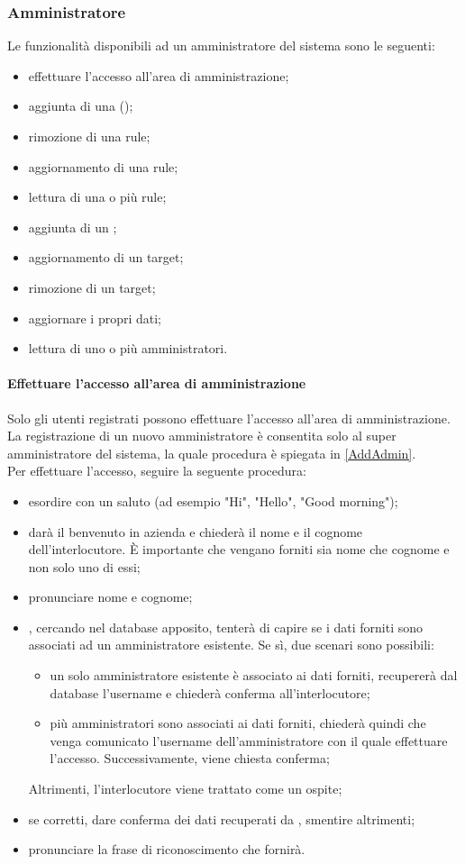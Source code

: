 \subsubsection{Amministratore}\label{admin}
Le funzionalità disponibili ad un amministratore del sistema sono le seguenti:
\begin{itemize}
	\item effettuare l'accesso all'area di amministrazione;
	\item aggiunta di una  ();
	\item rimozione di una rule;
	\item aggiornamento di una rule;
	\item lettura di una o più rule;
	\item aggiunta di un ;
	\item aggiornamento di un target;
	\item rimozione di un target;
	\item aggiornare i propri dati;
	\item lettura di uno o più amministratori.
\end{itemize}
\paragraph{Effettuare l'accesso all'area di amministrazione}\label{adminArea}
Solo gli utenti registrati possono effettuare l'accesso all'area di amministrazione. La registrazione di un nuovo amministratore è consentita solo al super amministratore del sistema, la quale procedura è spiegata in \ref{AddAdmin}. \\
Per effettuare l'accesso, seguire la seguente procedura:
\begin{itemize}
	\item esordire con un saluto (ad esempio "Hi", "Hello", "Good morning");
	\item \PROGETTO{} darà il benvenuto in azienda e chiederà il nome e il cognome dell'interlocutore. È importante che vengano forniti sia nome che cognome e non solo uno di essi;
	\item pronunciare nome e cognome;
	\item \PROGETTO, cercando nel database apposito, tenterà di capire se i dati forniti sono associati ad un amministratore esistente. Se sì, due scenari sono possibili:
	\begin{itemize}
		\item un solo amministratore esistente è associato ai dati forniti, \PROGETTO{} recupererà dal database l'username e chiederà conferma all'interlocutore;
		\item più amministratori sono associati ai dati forniti, \PROGETTO{} chiederà quindi che venga comunicato l'username dell'amministratore con il quale effettuare l'accesso. Successivamente, viene chiesta conferma; 
	\end{itemize}
	Altrimenti, l'interlocutore viene trattato come un ospite;
	\item se corretti, dare conferma dei dati recuperati da \PROGETTO, smentire altrimenti;
	\item pronunciare la frase di riconoscimento che \PROGETTO{} fornirà.
\end{itemize}
